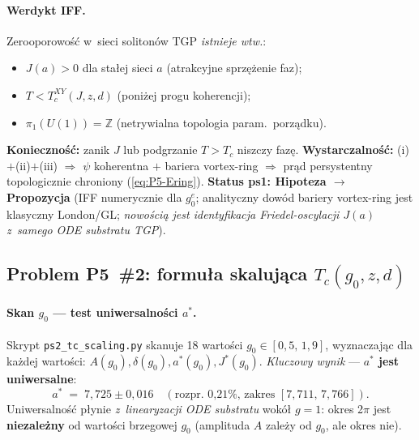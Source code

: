 \paragraph{Werdykt IFF.}
Zerooporowo\'s\'c w~sieci soliton\'ow TGP \emph{istnieje wtw.}:
\begin{itemize}\itemsep0pt
  \item[(i)]   $J(a) > 0$ dla sta\l{}ej sieci $a$ (atrakcyjne sprz\k{e}\.zenie faz);
  \item[(ii)]  $T < T_c^{XY}(J,z,d)$ (poni\.zej progu koherencji);
  \item[(iii)] $\pi_1(U(1)) = \mathbb{Z}$ (netrywialna topologia param.~porz\k{a}dku).
\end{itemize}
\textbf{Konieczno\'s\'c:} zanik $J$ lub podgrzanie $T>T_c$ niszczy faz\k{e}.
\textbf{Wystarczalno\'s\'c:} (i)$+$(ii)$+$(iii) $\Rightarrow$
$\psi$ koherentna $+$ bariera vortex-ring $\Rightarrow$ pr\k{a}d persystentny
topologicznie chroniony (\eqref{eq:P5-Ering}).
\textbf{Status ps1: Hipoteza $\to$ Propozycja} (IFF numerycznie dla $g_0^e$;
analityczny dow\'od bariery vortex-ring jest klasyczny London/GL;
\emph{nowo\'sci\k{a} jest identyfikacja Friedel-oscylacji $J(a)$
z~samego ODE substratu TGP}).

\subsection{Problem P5~\#2: formu\l{}a skalująca $T_c(g_0, z, d)$}%
\label{app:P5-ps2}

\paragraph{Skan $g_0$ --- test uniwersalno\'sci $a^*$.}
Skrypt \texttt{ps2\_tc\_scaling.py} skanuje 18 warto\'sci
$g_0 \in [0{,}5,\,1{,}9]$, wyznaczaj\k{a}c dla ka\.zdej warto\'sci:
$A(g_0), \delta(g_0), a^*(g_0), J^*(g_0)$.
\emph{Kluczowy wynik} --- \textbf{$a^*$ jest uniwersalne}:
\begin{equation}
\label{eq:P5-astar}
  a^* \;=\; 7{,}725 \pm 0{,}016 \quad (\text{rozpr.~0{,}21\%, zakres } [7{,}711,\,7{,}766]).
\end{equation}
Uniwersalno\'s\'c p\l{}ynie \emph{z~linearyzacji ODE substratu}
wok\'o\l{} $g=1$: okres 2$\pi$ jest \textbf{niezale\.zny} od warto\'sci brzegowej $g_0$
(amplituda $A$ zale\.zy od $g_0$, ale okres nie).

